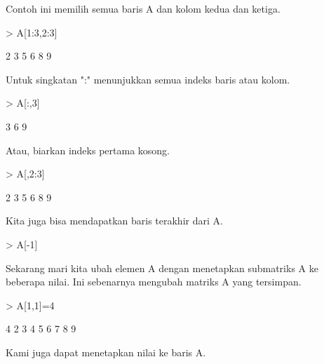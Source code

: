 \documentclass[a4paper,10pt]{article}
\begin{document}
\begin{eulernotebook}
\begin{eulercomment}
\begin{eulercomment}
\begin{eulercomment}
\begin{eulercomment}
\begin{eulercomment}
\begin{eulercomment}
\begin{eulercomment}
Contoh ini memilih semua baris A dan kolom kedua dan ketiga.
\end{eulercomment}
\begin{eulerprompt}
> A[1:3,2:3]
\end{eulerprompt}
\begin{euleroutput}
              2             3 
              5             6 
              8             9 
\end{euleroutput}
\begin{eulercomment}
Untuk singkatan ":" menunjukkan semua indeks baris atau kolom.
\end{eulercomment}
\begin{eulerprompt}
> A[:,3]
\end{eulerprompt}
\begin{euleroutput}
              3 
              6 
              9 
\end{euleroutput}
\begin{eulercomment}
Atau, biarkan indeks pertama kosong.
\end{eulercomment}
\begin{eulerprompt}
> A[,2:3]
\end{eulerprompt}
\begin{euleroutput}
              2             3 
              5             6 
              8             9 
\end{euleroutput}
\begin{eulercomment}
Kita juga bisa mendapatkan baris terakhir dari A.
\end{eulercomment}
\begin{eulerprompt}
> A[-1]
\end{eulerprompt}
\begin{euleroutput}
  [7,  8,  9]
\end{euleroutput}
\begin{eulercomment}
Sekarang mari kita ubah elemen A dengan menetapkan submatriks A ke
beberapa nilai. Ini sebenarnya mengubah matriks A yang tersimpan.
\end{eulercomment}
\begin{eulerprompt}
> A[1,1]=4
\end{eulerprompt}
\begin{euleroutput}
              4             2             3 
              4             5             6 
              7             8             9 
\end{euleroutput}
\begin{eulercomment}
Kami juga dapat menetapkan nilai ke baris A.

\end{eulercomment}
\end{eulercomment}
\end{eulercomment}
\end{eulercomment}
\end{eulercomment}
\end{eulercomment}
\end{eulercomment}
\end{eulernotebook}
\end{document}
